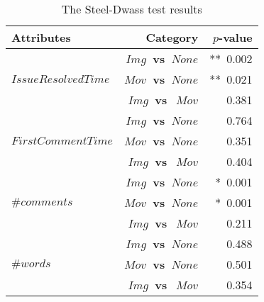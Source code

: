 \begin{table}[t]
  \begin{center}
  \caption{The Steel-Dwass test results}
  \begin{tabular}{l r|r}
    \toprule
    Attributes & Category & $p$-value\\
    \midrule
     & \bf{$Img$~vs~$None$} & **~0.002 \\
     $IssueResolvedTime$ & \bf{$Mov$~vs~$None$} & **~0.021 \\
     & \bf{$Img$~vs~$~Mov$} & 0.381 \\
    \midrule
     & \bf{$Img$~vs~$None$} & 0.764 \\
     $FirstCommentTime$ & \bf{$Mov$~vs~$None$} & 0.351 \\
     & \bf{$Img$~vs~$~Mov$} & 0.404 \\
    \midrule
     & \bf{$Img$~vs~$None$} & *~0.001 \\
     $\#comments$ & \bf{$Mov$~vs~$None$} & *~0.001 \\
     & \bf{$Img$~vs~$~Mov$} & 0.211 \\
    \midrule
     & \bf{$Img$~vs~$None$} & 0.488 \\
     $\#words$  & \bf{$Mov$~vs~$None$} & 0.501 \\
     & \bf{$Img$~vs~$~Mov$} & 0.354 \\
    \bottomrule
  \end{tabular}\\
  \label{tab:Steel-Dwass-test}
  \end{center}
\end{table}